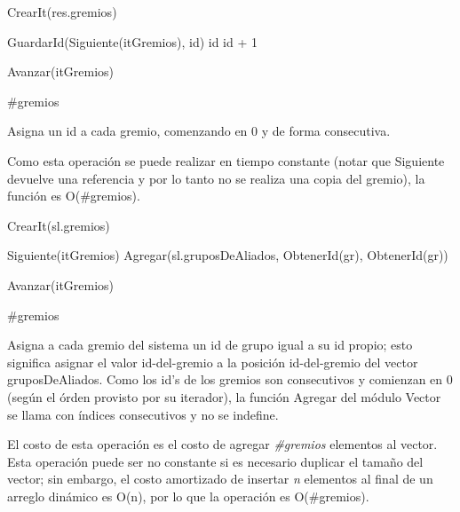 {
	\state {} 											
	\state

	\state {} \asig CrearIt(res.gremios)		
		\state
		
		\state GuardarId(Siguiente(itGremios), id)							
		\state id \asig id + 1												
		
		\state
		\state Avanzar(itGremios)											
	\endwhile
}
{ \#gremios }
{ Asigna un id a cada gremio, comenzando en 0 y de forma consecutiva.

\hspace{10pt} Como esta operaci\'on se puede realizar en tiempo constante (notar que Siguiente devuelve una referencia y por lo tanto no se realiza una copia del gremio), la funci\'on es O(\#gremios). }

{
	\state {} \asig CrearIt(sl.gremios)		
											
		\state
		
		\state {} \asig Siguiente(itGremios)							
		\state Agregar(sl.gruposDeAliados, ObtenerId(gr), ObtenerId(gr))	

		\state
		\state Avanzar(itGremios)											
	\endwhile
}
{ \#gremios }
{ Asigna a cada gremio del sistema un id de grupo igual a su id propio; esto significa asignar el valor id-del-gremio a la posici\'on id-del-gremio del vector gruposDeAliados. Como los id's de los gremios son consecutivos y comienzan en 0 (seg\'un el \'orden provisto por su iterador), la funci\'on Agregar del m\'odulo Vector se llama con \'indices consecutivos y no se indefine.

\hspace{10pt} El costo de esta operaci\'on es el costo de agregar \emph{\#gremios} elementos al vector. Esta operaci\'on puede ser no constante si es necesario duplicar el tamaño del vector; sin embargo, el costo amortizado de insertar \emph{n} elementos al final de un arreglo din\'amico es O(n), por lo que la operaci\'on es O(\#gremios). }

